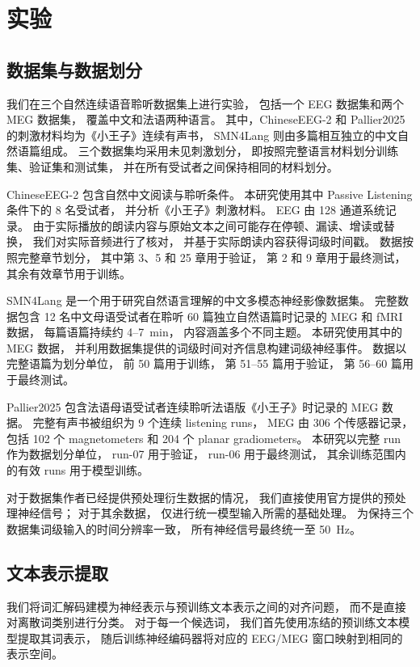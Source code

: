 
\section{实验}

\subsection{数据集与数据划分}

我们在三个自然连续语音聆听数据集上进行实验，
包括一个 EEG 数据集和两个 MEG 数据集，
覆盖中文和法语两种语言。
其中，ChineseEEG-2 和 Pallier2025 的刺激材料均为《小王子》连续有声书，
SMN4Lang 则由多篇相互独立的中文自然语篇组成。
三个数据集均采用未见刺激划分，
即按照完整语言材料划分训练集、验证集和测试集，
并在所有受试者之间保持相同的材料划分。

ChineseEEG-2 包含自然中文阅读与聆听条件。
本研究使用其中 Passive Listening 条件下的 8 名受试者，
并分析《小王子》刺激材料。
EEG 由 128 通道系统记录。
由于实际播放的朗读内容与原始文本之间可能存在停顿、漏读、增读或替换，
我们对实际音频进行了核对，
并基于实际朗读内容获得词级时间戳。
数据按照完整章节划分，
其中第 3、5 和 25 章用于验证，
第 2 和 9 章用于最终测试，
其余有效章节用于训练。

SMN4Lang 是一个用于研究自然语言理解的中文多模态神经影像数据集。
完整数据包含 12 名中文母语受试者在聆听 60 篇独立自然语篇时记录的
MEG 和 fMRI 数据，
每篇语篇持续约 4--7~min，
内容涵盖多个不同主题。
本研究使用其中的 MEG 数据，
并利用数据集提供的词级时间对齐信息构建词级神经事件。
数据以完整语篇为划分单位，
前 50 篇用于训练，
第 51--55 篇用于验证，
第 56--60 篇用于最终测试。

Pallier2025 包含法语母语受试者连续聆听法语版《小王子》时记录的 MEG 数据。
完整有声书被组织为 9 个连续 listening runs，
MEG 由 306 个传感器记录，
包括 102 个 magnetometers 和 204 个 planar gradiometers。
本研究以完整 run 作为数据划分单位，
run-07 用于验证，
run-06 用于最终测试，
其余训练范围内的有效 runs 用于模型训练。

对于数据集作者已经提供预处理衍生数据的情况，
我们直接使用官方提供的预处理神经信号；
对于其余数据，
仅进行统一模型输入所需的基础处理。
为保持三个数据集词级输入的时间分辨率一致，
所有神经信号最终统一至 50~Hz。

\subsection{文本表示提取}

我们将词汇解码建模为神经表示与预训练文本表示之间的对齐问题，
而不是直接对离散词类别进行分类。
对于每一个候选词，
我们首先使用冻结的预训练文本模型提取其词表示，
随后训练神经编码器将对应的 EEG/MEG 窗口映射到相同的表示空间。

